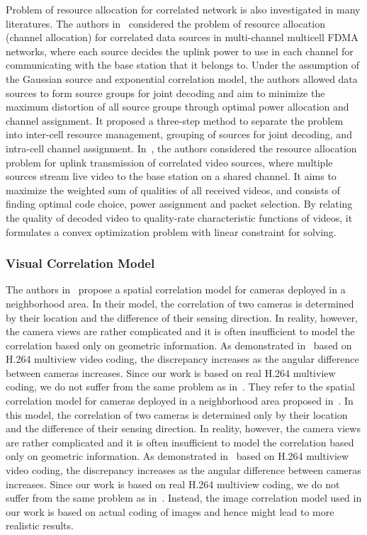 Problem of resource allocation for correlated network is also investigated in many literatures.
The authors in~\cite{CorrelationAwareRA} considered the problem of resource allocation (channel allocation) for correlated data sources in multi-channel multicell FDMA networks, where each source decides the uplink power to use in each channel for communicating with the base station that it belongs to.
Under the assumption of the Gaussian source and exponential correlation model, the authors allowed data sources to form source groups for joint decoding and aim to minimize the maximum distortion of all source groups through optimal power allocation and channel assignment.
It proposed a three-step method to separate the problem into inter-cell resource management, grouping of sources for joint decoding, and intra-cell channel assignment.
In~\cite{AdaptiveCrossLayerRA}, the authors considered the resource allocation problem for uplink transmission of correlated video sources, where multiple sources stream live video to the base station on a shared channel.
It aims to maximize the weighted sum of qualities of all received videos, and consists of finding optimal code choice, power assignment and packet selection.
By relating the quality of decoded video to quality-rate characteristic functions of videos, it formulates a convex optimization problem with linear constraint for solving.
%
\subsubsection{Visual Correlation Model}
The authors in~\cite{SpatialCorrelationModel} propose a spatial correlation model for cameras deployed in a neighborhood area.
In their model, the correlation of two cameras is determined by their location and the difference of their sensing direction.
In reality, however, the camera views are rather complicated and it is often insufficient to model the correlation based only on geometric information.
As demonstrated in~\cite{RealisticModel} based on H.264 multiview video coding, the discrepancy increases as the angular difference between cameras increases.
Since our work is based on real H.264 multiview coding, we do not suffer from the same problem as in~\cite{SpatialCorrelationModel}.
%
They refer to the spatial correlation model for cameras deployed in a neighborhood area proposed in~\cite{SpatialCorrelationModel}.
In this model, the correlation of two cameras is determined only by their location and the difference of their sensing direction.
In reality, however, the camera views are rather complicated and it is often insufficient to model the correlation based only on geometric information.
As demonstrated in~\cite{RealisticModel} based on H.264 multiview video coding, the discrepancy increases as the angular difference between cameras increases.
Since our work is based on real H.264 multiview coding, we do not suffer from the same problem as in~\cite{DMCPclustering,imageModelCluster}.
Instead, the image correlation model used in our work is based on actual coding of images and hence might lead to more realistic results.
%
